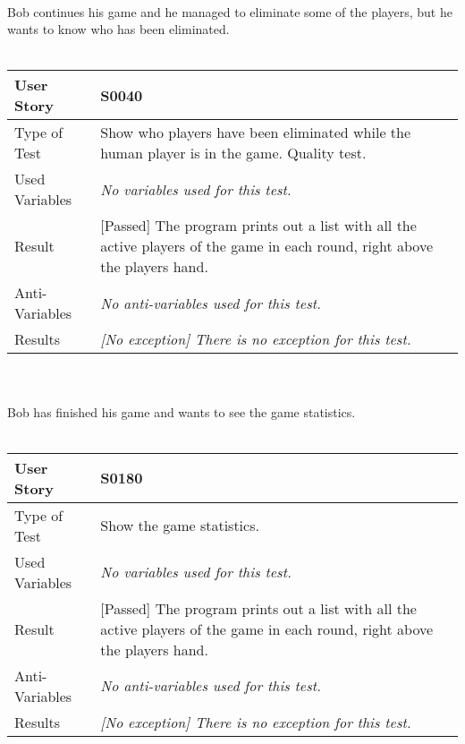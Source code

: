 \vspace{0.2cm}\\
Bob continues his game and he managed to eliminate some of the players, but he wants to know who has been eliminated.\\
\vspace{0.2cm}\\  
\begin{tabular}{l | p{12cm}}
User Story & \textbf{S0040}\\ \hline
Type of Test & Show who players have been eliminated while the human player is in the game. Quality test.\\ \hline
Used Variables & \textit{No variables used for this test.}\\ \hline
Result & [Passed] The program prints out a list with all the active players of the game in each round, right above the players hand.\\ \hline
Anti-Variables & \textit{No anti-variables used for this test.}\\ \hline
Results & \textit{[No exception] There is no exception for this test.}\\ \hline
\end{tabular}\\
\vspace{0.2cm}\\
Bob has finished his game and wants to see the game statistics.\\
\vspace{0.2cm}\\  
\begin{tabular}{l | p{12cm}}
User Story & \textbf{S0180}\\ \hline
Type of Test & Show the game statistics.\\ \hline
Used Variables & \textit{No variables used for this test.}\\ \hline
Result & [Passed] The program prints out a list with all the active players of the game in each round, right above the players hand.\\ \hline
Anti-Variables & \textit{No anti-variables used for this test.}\\ \hline
Results & \textit{[No exception] There is no exception for this test.}\\ \hline
\end{tabular}\\
